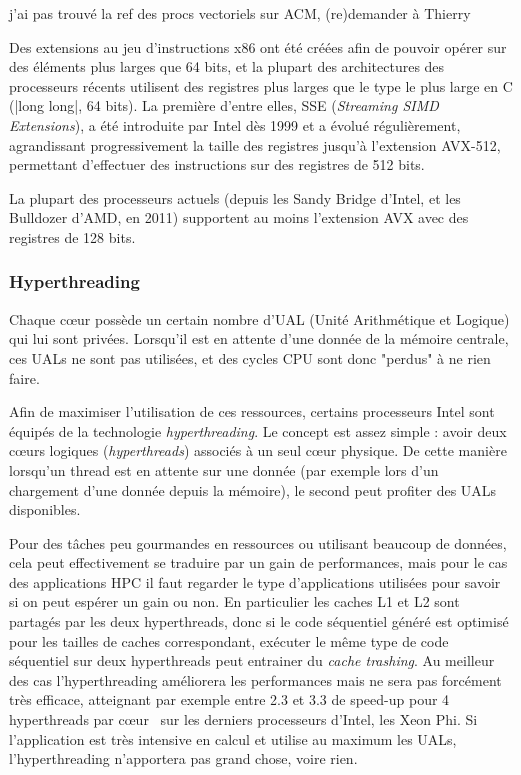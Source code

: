\begin{todo}
  j'ai pas trouvé la ref des procs vectoriels sur ACM, (re)demander à Thierry
\end{todo}

Des extensions au jeu d'instructions x86 ont été créées afin de pouvoir opérer sur des éléments plus larges que 64 bits, et la plupart des architectures des processeurs récents utilisent des registres plus larges que le type le plus large en C (|long long|, 64 bits).
La première d'entre elles, SSE (\emph{Streaming SIMD Extensions}), a été introduite par Intel dès 1999 et a évolué régulièrement, agrandissant progressivement la taille des registres jusqu'à l'extension AVX-512, permettant d'effectuer des instructions sur des registres de 512 bits.

La plupart des processeurs actuels (depuis les Sandy Bridge d'Intel, et les Bulldozer d'AMD, en 2011) supportent au moins l'extension AVX avec des registres de 128 bits.

\subsubsection{Hyperthreading}

Chaque cœur possède un certain nombre d'UAL (Unité Arithmétique et Logique) qui lui sont privées. Lorsqu'il est en attente d'une donnée de la mémoire centrale, ces UALs ne sont pas utilisées, et des cycles CPU sont donc "perdus" à ne rien faire.

Afin de maximiser l'utilisation de ces ressources, certains processeurs Intel sont équipés de la technologie \emph{hyperthreading}.
Le concept est assez simple : avoir deux cœurs logiques (\emph{hyperthreads}) associés à un seul cœur physique.
De cette manière lorsqu'un thread est en attente sur une donnée (par exemple lors d'un chargement d'une donnée depuis la mémoire), le second peut profiter des UALs disponibles.

Pour des tâches peu gourmandes en ressources ou utilisant beaucoup de données, cela peut effectivement se traduire par un gain de performances, mais pour le cas des applications HPC il faut regarder le type d'applications utilisées pour savoir si on peut espérer un gain ou non.
En particulier les caches L1 et L2 sont partagés par les deux hyperthreads, donc si le code séquentiel généré est optimisé pour les tailles de caches correspondant, exécuter le même type de code séquentiel sur deux hyperthreads peut entrainer du \emph{cache trashing}.
Au meilleur des cas l'hyperthreading améliorera les performances mais ne sera pas forcément très efficace, atteignant par exemple entre 2.3 et 3.3 de speed-up pour 4 hyperthreads par cœur~\cite{Jeffers2016} sur les derniers processeurs d'Intel, les Xeon Phi.
Si l'application est très intensive en calcul et utilise au maximum les UALs, l'hyperthreading n'apportera pas grand chose, voire rien.

